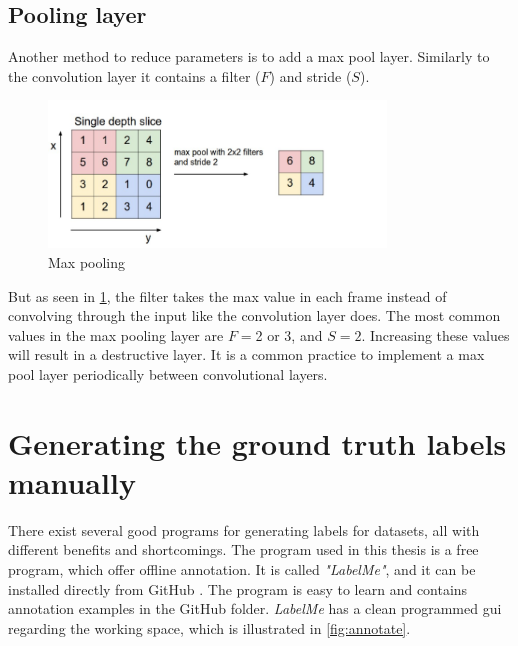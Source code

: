 \documentclass[USenglish]{ifimaster}  %
\begin{document}
\subsection{Pooling layer}
Another method to reduce parameters is to add a max pool layer. Similarly to the convolution layer it contains a filter ($F$) and stride ($S$). 

\begin{figure}[ht]
    \centering
    \includegraphics[width=0.8\textwidth]{bilder/max_pooling.png}
    \caption{Max pooling \cite{website:cs231n}}
    \label{fig:max_pooling}
\end{figure}

But as seen in \cref{fig:max_pooling}, the filter takes the max value in each frame instead of convolving through the input like the convolution layer does. The most common values in the max pooling layer are $F=$2 or 3, and $S=2$. Increasing these values will result in a destructive layer. It is a common practice to implement a max pool layer periodically between convolutional layers.

\section{Generating the ground truth labels manually}
There exist several good programs for generating labels for datasets, all with different benefits and shortcomings. The program used in this thesis is a free program, which offer offline annotation. It is called \textit{"LabelMe"}, and it can be installed directly from GitHub \cite{website:labelme}. The program is easy to learn and contains annotation examples in the GitHub folder. \textit{LabelMe} has a clean programmed \ac{gui} regarding the working space, which is illustrated in \cref{fig:annotate}. 
\end{document}
